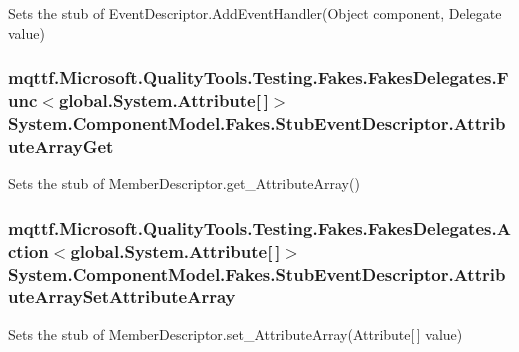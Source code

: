 Sets the stub of Event\-Descriptor.\-Add\-Event\-Handler(\-Object component, Delegate value)

\hypertarget{class_system_1_1_component_model_1_1_fakes_1_1_stub_event_descriptor_ab33953e16d035094f599fd1c5e5e66f3}{
\subsubsection[{Attribute\-Array\-Get}]{\setlength{\rightskip}{0pt plus 5cm}mqttf.\-Microsoft.\-Quality\-Tools.\-Testing.\-Fakes.\-Fakes\-Delegates.\-Func$<$global.\-System.\-Attribute\mbox{[}$\,$\mbox{]}$>$ System.\-Component\-Model.\-Fakes.\-Stub\-Event\-Descriptor.\-Attribute\-Array\-Get}}\label{class_system_1_1_component_model_1_1_fakes_1_1_stub_event_descriptor_ab33953e16d035094f599fd1c5e5e66f3}


Sets the stub of Member\-Descriptor.\-get\-\_\-\-Attribute\-Array()

\hypertarget{class_system_1_1_component_model_1_1_fakes_1_1_stub_event_descriptor_a84efecb2111f32467e640d575e5c85c1}{
\subsubsection[{Attribute\-Array\-Set\-Attribute\-Array}]{\setlength{\rightskip}{0pt plus 5cm}mqttf.\-Microsoft.\-Quality\-Tools.\-Testing.\-Fakes.\-Fakes\-Delegates.\-Action$<$global.\-System.\-Attribute\mbox{[}$\,$\mbox{]}$>$ System.\-Component\-Model.\-Fakes.\-Stub\-Event\-Descriptor.\-Attribute\-Array\-Set\-Attribute\-Array}}\label{class_system_1_1_component_model_1_1_fakes_1_1_stub_event_descriptor_a84efecb2111f32467e640d575e5c85c1}


Sets the stub of Member\-Descriptor.\-set\-\_\-\-Attribute\-Array(\-Attribute\mbox{[}$\,$\mbox{]} value)


